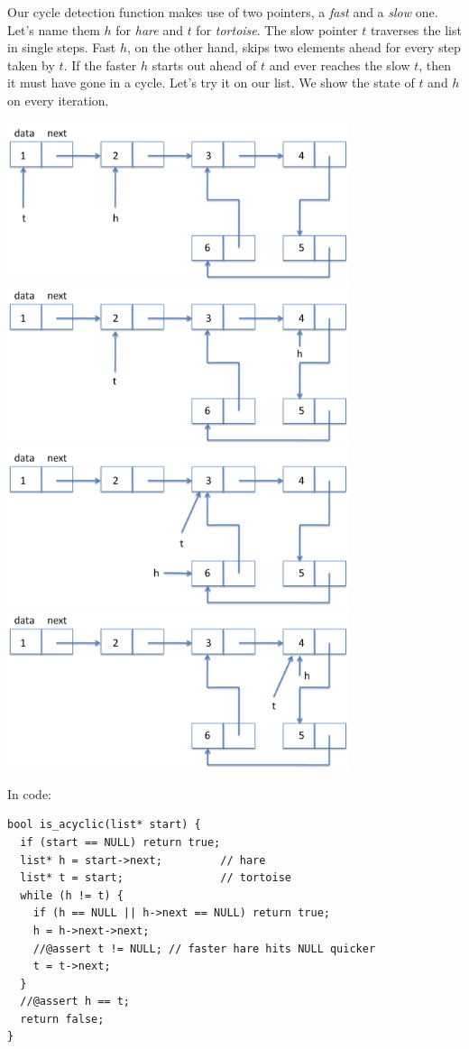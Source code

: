Our cycle detection function makes use of two pointers, a \emph{fast}
and a \emph{slow} one.  Let's name them $h$ for \emph{hare} and $t$
for \emph{tortoise}.  The slow pointer $t$ traverses the list in
single steps.  Fast $h$, on the other hand, skips two elements ahead
for every step taken by $t$.  If the faster $h$ starts out ahead of
$t$ and ever reaches the slow $t$, then it must have gone in a cycle.
Let's try it on our list.  We show the state of $t$ and $h$ on every
iteration.
\begin{center}\enlargethispage{5ex}
\includegraphics[width=0.75\textwidth]{img/circular2.png}
\bigskip
\includegraphics[width=0.75\textwidth]{img/circular3.png}
\bigskip
\includegraphics[width=0.75\textwidth]{img/circular4.png}
\bigskip
\includegraphics[width=0.75\textwidth]{img/circular5.png}
\end{center}
In code:
\begin{lstlisting}[language={[C0]C}]
bool is_acyclic(list* start) {
  if (start == NULL) return true;
  list* h = start->next;         // hare
  list* t = start;               // tortoise
  while (h != t) {
    if (h == NULL || h->next == NULL) return true;
    h = h->next->next;
    //@assert t != NULL; // faster hare hits NULL quicker
    t = t->next;
  }
  //@assert h == t;
  return false;
}
\end{lstlisting}

